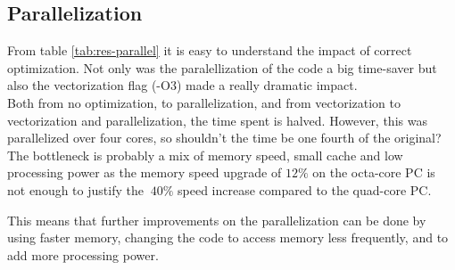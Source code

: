 \documentclass[../main.tex]{subfiles}
\begin{document}
\subsection{Parallelization}
From table \ref{tab:res-parallel} it is easy to understand the impact of correct optimization. Not only was the paralellization of the code a big time-saver but also the vectorization flag (-O3) made a really dramatic impact.\\

Both from no optimization, to parallelization, and from vectorization to vectorization and parallelization, the time spent is halved. However, this was parallelized over four cores, so shouldn't the time be one fourth of the original? The bottleneck is probably a mix of memory speed, small cache and low processing power as the memory speed upgrade of $12\%$ on the octa-core PC is not enough to justify the $~40\%$ speed increase compared to the quad-core PC.

This means that further improvements on the parallelization can be done by using faster memory, changing the code to access memory less frequently, and to add more processing power.
\end{document}
